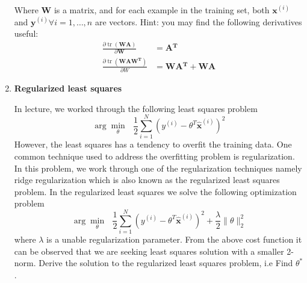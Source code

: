 \documentclass [11pt] {article}
\newcommand{\T}{\bf{T}}
\newcommand{\x}{\bf{x}}
\newcommand{\y}{\bf{y}}
\newcommand{\A}{\bf{A}}
\newcommand{\W}{\bf{W}}
\newcommand{\AT}{\bf{A$^{\T}$}}
\DeclareMathOperator{\tr}{tr}
\renewcommand{\bf}[1]{\textbf{{#1}}}
\begin{document}
\begin{enumerate}
        Where $\W$ is a matrix, and for each example in the training set, both $\x^{(i)}$ and 
        $\y^{(i)} \forall i = 1, \ldots, n$ are vectors.
        \newline
        Hint: you may find the following derivatives useful:
        \begin{align*}
            \frac{\partial \tr \left( \W \A \right)}{\partial \W} &= \AT \\
            \frac{\partial \tr \left( \W \A \W^{\T} \right)}{\partial W} &= \W \AT + \W \A
        \end{align*}

    \item \bf{Regularized least squares} \vspace{10pt}

        In lecture, we worked through the following least squares problem
        \[\arg \underset{\theta}{\min} \text{ } \frac{1}{2} \sum^{N}_{i = 1} (y^{(i)} - \theta^T \hat{\x}^{(i)})^2\]
        However, the least squares has a tendency to overfit the training data. One common 
        technique used to address the overfitting problem is regularization. In this problem, 
        we work through one of the regularization techniques namely ridge regularization which 
        is also known as the regularized least squares problem. In the regularized least 
        squares we solve the following optimization problem
        \[\arg \underset{\theta}{\min} \text{ } \frac{1}{2} \sum^{N}_{i = 1} (y^{(i)} - \theta^T \hat{\x}^{(i)})^2 + \frac{\lambda}{2} \|\theta\|^2_2\]
        where $\lambda$ is a unable regularization parameter. From the above cost function it 
        can be observed that we are seeking least squares solution with a smaller 2-norm. 
        Derive the solution to the regularized least squares problem, i.e Find $\theta^*$.
\end{enumerate}
\end{document}
